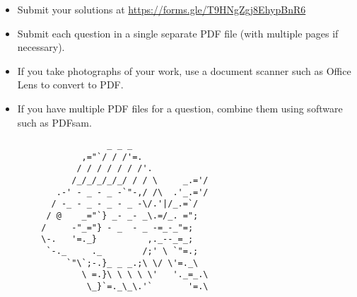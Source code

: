 \documentclass{article}
\begin{document}
\vfill
\small
\begin{itemize}
	\item Submit your solutions at \href{https://forms.gle/T9HNgZgj8EhypBnR6}{https://forms.gle/T9HNgZgj8EhypBnR6}
	\item Submit each question in a single separate PDF file (with multiple pages if necessary).
	\item If you take photographs of your work, use a document scanner such as Office Lens to convert to PDF.
	\item If you have multiple PDF files for a question, combine them using software such as PDFsam.
\end{itemize}

\vfill
\centering
\small
\begin{BVerbatim}
                     _ _ _
                ,="`/ / /'=.
               / / / / / / /'.
              /_/_/_/_/_/ / / \     _.='/
           .-' - _ - _ -`"-,/ /\  .'_.='/
          / -_ - _ - _ - _ -\/.'|/_.=`/
         / @    _="`} _- _- _\.=/_. =";
        /     -"_="} - _  - _ -=_-_"=;
        \-.   '=._}          ,._--_=_;
         `-._     ._        /;' \ `"=.;
             `"\`;-.}_ _ _.;\ \/ \'=._\
                \ =.}\ \ \ \ \'   '._=_.\
                 \_}`=._\_\.'`       '=.\
\end{BVerbatim}
\end{document}
